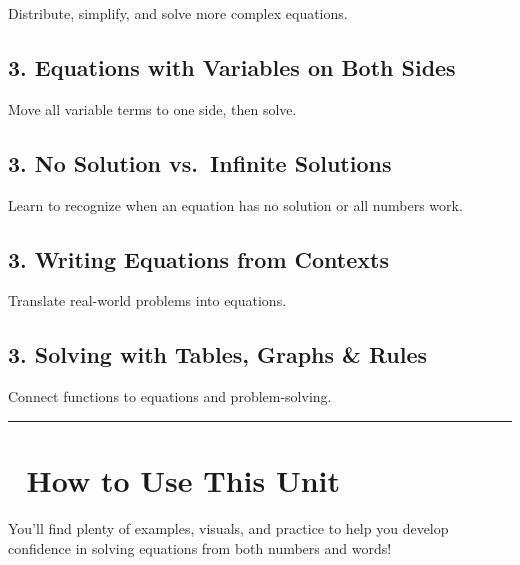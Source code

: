 \documentclass[
  letterpaper,
]{scrrept}
\begin{document}
Distribute, simplify, and solve more complex equations.

\subsection*{3. Equations with Variables on Both
Sides}\label{equations-with-variables-on-both-sides}

Move all variable terms to one side, then solve.

\subsection*{3. No Solution vs.~Infinite
Solutions}\label{no-solution-vs.-infinite-solutions}

Learn to recognize when an equation has no solution or all numbers work.

\subsection*{3. Writing Equations from
Contexts}\label{writing-equations-from-contexts}

Translate real-world problems into equations.

\subsection*{3. Solving with Tables, Graphs \&
Rules}\label{solving-with-tables-graphs-rules}

Connect functions to equations and problem-solving.

\begin{center}\rule{0.5\linewidth}{0.5pt}\end{center}

\section*{🧭 How to Use This Unit}\label{how-to-use-this-unit}


You'll find plenty of examples, visuals, and practice to help you
develop confidence in solving equations from both numbers and words!
\end{document}
